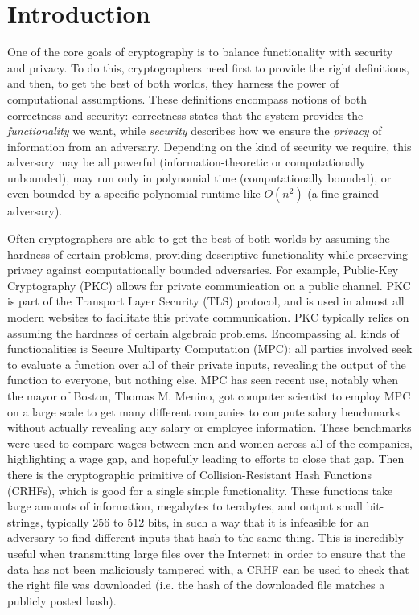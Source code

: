 
\chapter{Introduction}

One of the core goals of cryptography is to balance functionality with security and privacy.
To do this, cryptographers need first to provide the right definitions, and then, to get the best of both worlds, they harness the power of computational assumptions. These definitions encompass notions of both correctness and security:  correctness states that the system provides the \emph{functionality} we want, while \emph{security}
describes how we ensure the \emph{privacy} of information from an adversary.
Depending on the kind of security we require, this adversary may be all powerful (information-theoretic or computationally unbounded), may run only in polynomial time (computationally bounded), or even bounded by a specific polynomial runtime like $O(n^2)$ (a fine-grained adversary).

Often cryptographers are able to get the best of both worlds by assuming the hardness of certain problems,  providing descriptive functionality while preserving privacy against computationally bounded adversaries. For example, Public-Key Cryptography (PKC) allows for private communication on a public channel. PKC is part of the Transport Layer Security (TLS) protocol, and is used in almost all modern websites to facilitate this private communication. PKC typically relies on assuming the hardness of certain algebraic problems.
Encompassing all kinds of functionalities is Secure Multiparty Computation (MPC): all parties involved seek to evaluate a function over all of their private inputs, revealing the output of the function to everyone, but nothing else. MPC has seen recent use, notably when the mayor of Boston, Thomas M. Menino, got computer scientist to employ MPC on a large scale to get many different companies to compute salary benchmarks without actually revealing any salary or employee information. These benchmarks were used to compare wages between men and women across all of the companies, highlighting a wage gap, and hopefully leading to efforts to close that gap\cite{MPCApp14}.
Then there is the cryptographic primitive of Collision-Resistant Hash Functions (CRHFs), which is good for a single simple functionality. These functions take large amounts of information, megabytes to terabytes, and output small bit-strings, typically 256 to 512 bits, in such a way that it is infeasible for an adversary to find different inputs that hash to the same thing. This is incredibly useful when transmitting large files over the Internet: in order to ensure that the data has not been maliciously tampered with, a CRHF can be used to check that the right file was downloaded (i.e. the hash of the downloaded file matches a publicly posted hash).

